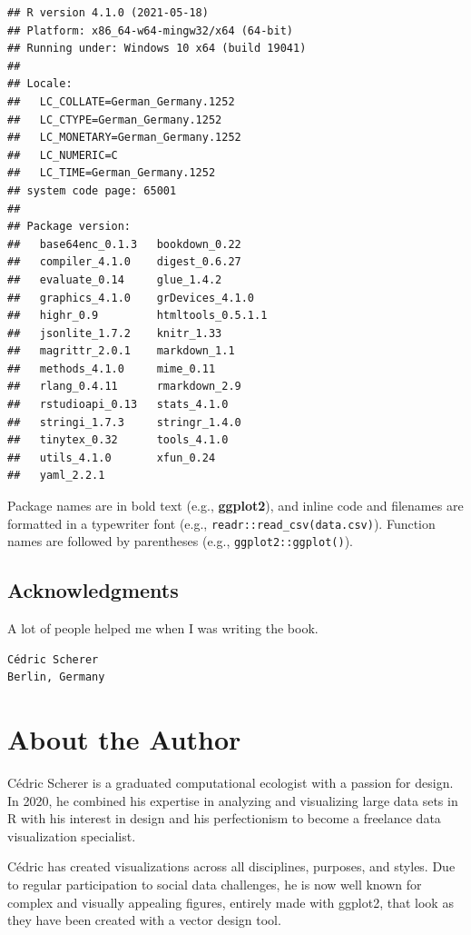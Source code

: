 \documentclass[
]{krantz}
\begin{document}
\begin{verbatim}
## R version 4.1.0 (2021-05-18)
## Platform: x86_64-w64-mingw32/x64 (64-bit)
## Running under: Windows 10 x64 (build 19041)
## 
## Locale:
##   LC_COLLATE=German_Germany.1252 
##   LC_CTYPE=German_Germany.1252   
##   LC_MONETARY=German_Germany.1252
##   LC_NUMERIC=C                   
##   LC_TIME=German_Germany.1252    
## system code page: 65001
## 
## Package version:
##   base64enc_0.1.3   bookdown_0.22    
##   compiler_4.1.0    digest_0.6.27    
##   evaluate_0.14     glue_1.4.2       
##   graphics_4.1.0    grDevices_4.1.0  
##   highr_0.9         htmltools_0.5.1.1
##   jsonlite_1.7.2    knitr_1.33       
##   magrittr_2.0.1    markdown_1.1     
##   methods_4.1.0     mime_0.11        
##   rlang_0.4.11      rmarkdown_2.9    
##   rstudioapi_0.13   stats_4.1.0      
##   stringi_1.7.3     stringr_1.4.0    
##   tinytex_0.32      tools_4.1.0      
##   utils_4.1.0       xfun_0.24        
##   yaml_2.2.1
\end{verbatim}

Package names are in bold text (e.g., \textbf{ggplot2}), and inline code and filenames are formatted in a typewriter font (e.g., \texttt{readr::read\_csv(\textquotesingle{}data.csv\textquotesingle{})}). Function names are followed by parentheses (e.g., \texttt{ggplot2::ggplot()}).

\hypertarget{acknowledgments}{%
\section*{Acknowledgments}\label{acknowledgments}}


A lot of people helped me when I was writing the book.

\begin{verbatim}
Cédric Scherer  
Berlin, Germany
\end{verbatim}

\hypertarget{about-the-author}{%
\chapter*{About the Author}\label{about-the-author}}


Cédric Scherer is a graduated computational ecologist with a passion for design. In 2020, he combined his expertise in analyzing and visualizing large data sets in R with his interest in design and his perfectionism to become a freelance data visualization specialist.

Cédric has created visualizations across all disciplines, purposes, and styles. Due to regular participation to social data challenges, he is now well known for complex and visually appealing figures, entirely made with ggplot2, that look as they have been created with a vector design tool.
\end{document}
